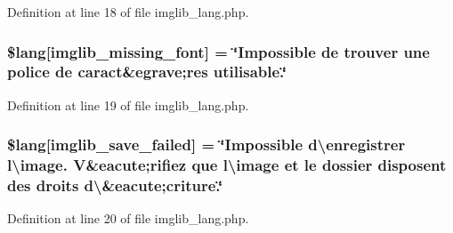 Definition at line 18 of file imglib\+\_\+lang.\+php.

\subsubsection[{\texorpdfstring{\$lang}{$lang}}]{\setlength{\rightskip}{0pt plus 5cm}\$lang\mbox{[}\textquotesingle{}imglib\+\_\+missing\+\_\+font\textquotesingle{}\mbox{]} = \char`\"{}Impossible de trouver une police de caract\&egrave;res utilisable.\char`\"{}}\hypertarget{application_2language_2french_2imglib__lang_8php_a935800aad2be18ca4fe99bb074674848}{}\label{application_2language_2french_2imglib__lang_8php_a935800aad2be18ca4fe99bb074674848}


Definition at line 19 of file imglib\+\_\+lang.\+php.

\subsubsection[{\texorpdfstring{\$lang}{$lang}}]{\setlength{\rightskip}{0pt plus 5cm}\$lang\mbox{[}\textquotesingle{}imglib\+\_\+save\+\_\+failed\textquotesingle{}\mbox{]} = \char`\"{}Impossible d\textbackslash{}\textquotesingle{}enregistrer l\textbackslash{}\textquotesingle{}image. V\&eacute;rifiez que l\textbackslash{}\textquotesingle{}image et le dossier disposent des droits d\textbackslash{}\textquotesingle{}\&eacute;criture.\char`\"{}}\hypertarget{application_2language_2french_2imglib__lang_8php_a4d7a99fddc60c97a7327fa0125dea264}{}\label{application_2language_2french_2imglib__lang_8php_a4d7a99fddc60c97a7327fa0125dea264}


Definition at line 20 of file imglib\+\_\+lang.\+php.

